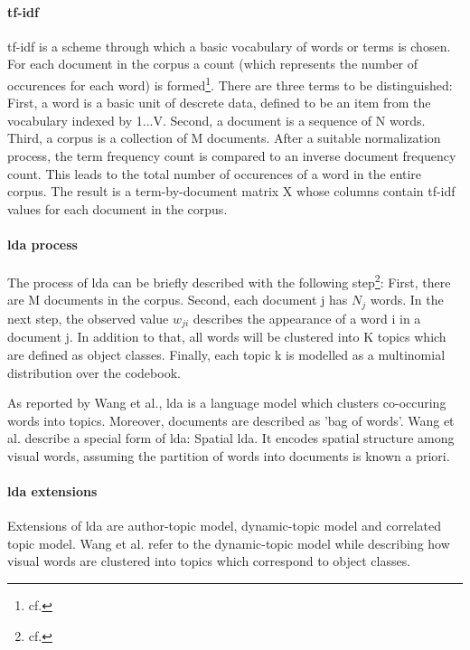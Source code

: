 \paragraph{\gls{tf-idf}}

\gls{tf-idf} is a scheme through which a basic vocabulary of words or terms is chosen. For each document in the corpus a count (which represents the number of occurences for each word) is formed\footnote{cf.\autocite{blei_2003}}. 
There are three terms to be distinguished: First, a word is a basic unit of descrete data, defined to be an item from the vocabulary indexed by {1...V}. Second, a document is a sequence of N words. Third, a corpus is a collection of M documents.
After a suitable normalization process, the term frequency count is compared to an inverse document frequency count. This leads to the total number of occurences of a word in the entire corpus.
The result is a term-by-document matrix X whose columns contain \gls{tf-idf} values for each document in the corpus. 

\paragraph{\gls{lda} process}

The process of \gls{lda} can be briefly described with the following step\footnote{cf.\autocite{wang_2008}}: First, there are M documents in the corpus. Second, each document j has \(N_{j}\) words. In the next step, the observed value \(w_{ji}\) describes the appearance of a word i in a document j. In addition to that, all words will be clustered into K topics which are defined as object classes. Finally, each topic k is modelled as a multinomial distribution over the codebook.

As reported by Wang et al., \gls{lda} is a language model which clusters co-occuring words into topics. Moreover, documents are described as 'bag of words'. 
Wang et al. describe a special form of \gls{lda}: Spatial \gls{lda}. It encodes spatial structure among visual words, assuming the partition of words into documents is known a priori. 

\paragraph{\gls{lda} extensions}

Extensions of \gls{lda} are author-topic model, dynamic-topic model and correlated topic model. Wang et al. refer to the dynamic-topic model while describing how visual words are clustered into topics which correspond to object classes.
 
